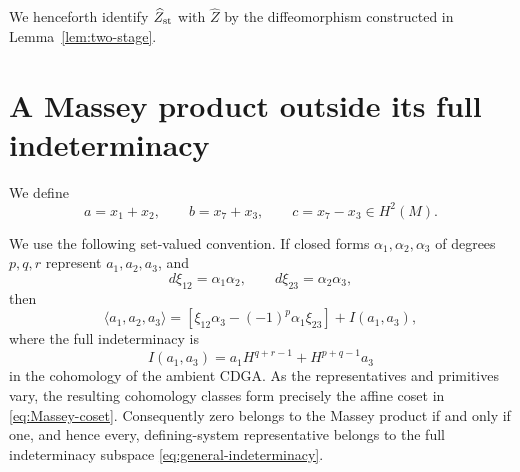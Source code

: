 \documentclass[11pt]{article}
\theoremstyle{remark}\newtheorem{remark}[theorem]{Remark}
\begin{document}
We henceforth identify $\widehat Z_{\rm st}$ with $\widehat Z$ by the
diffeomorphism constructed in Lemma~\ref{lem:two-stage}.

\section{A Massey product outside its full indeterminacy}
We define
\begin{equation}\label{eq:abc}
a=x_1+x_2,\qquad b=x_7+x_3,\qquad c=x_7-x_3\in H^2(M).
\end{equation}

We use the following set-valued convention.  If closed forms
$\alpha_1,\alpha_2,\alpha_3$ of degrees $p,q,r$ represent
$a_1,a_2,a_3$, and
\[
d\xi_{12}=\alpha_1\alpha_2,\qquad
d\xi_{23}=\alpha_2\alpha_3,
\]
then
\begin{equation}\label{eq:Massey-coset}
\langle a_1,a_2,a_3\rangle
=[\xi_{12}\alpha_3-(-1)^p\alpha_1\xi_{23}]
+I(a_1,a_3),
\end{equation}
where the full indeterminacy is
\begin{equation}\label{eq:general-indeterminacy}
I(a_1,a_3)=a_1H^{q+r-1}+H^{p+q-1}a_3
\end{equation}
in the cohomology of the ambient CDGA.
As the representatives and primitives vary, the resulting cohomology
classes form precisely the affine coset in \eqref{eq:Massey-coset}.
Consequently zero belongs to the Massey product if and only if one, and
hence every, defining-system representative belongs to the full
indeterminacy subspace \eqref{eq:general-indeterminacy}.
\end{document}
